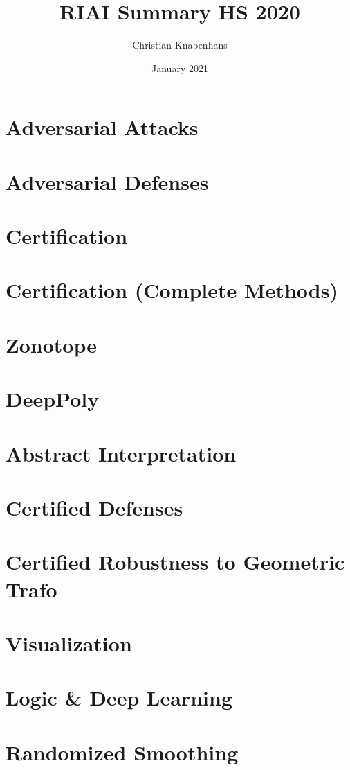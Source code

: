 \documentclass[11pt]{article}
\title{RIAI Summary HS 2020}
\author{Christian Knabenhans}
\date{January 2021}
\begin{document}
\pagestyle{empty}
\begin{multicols*}{3}
\section*{Adversarial Attacks}

\section*{Adversarial Defenses}

\section*{Certification}

\section*{Certification (Complete Methods)}

\section*{Zonotope}

\section*{DeepPoly}

\section*{Abstract Interpretation}

\section*{Certified Defenses }

\section*{Certified Robustness to Geometric Trafo}

\section*{Visualization}

\section*{Logic \& Deep Learning}
\section*{Randomized Smoothing}
\end{multicols*}
\end{document}
